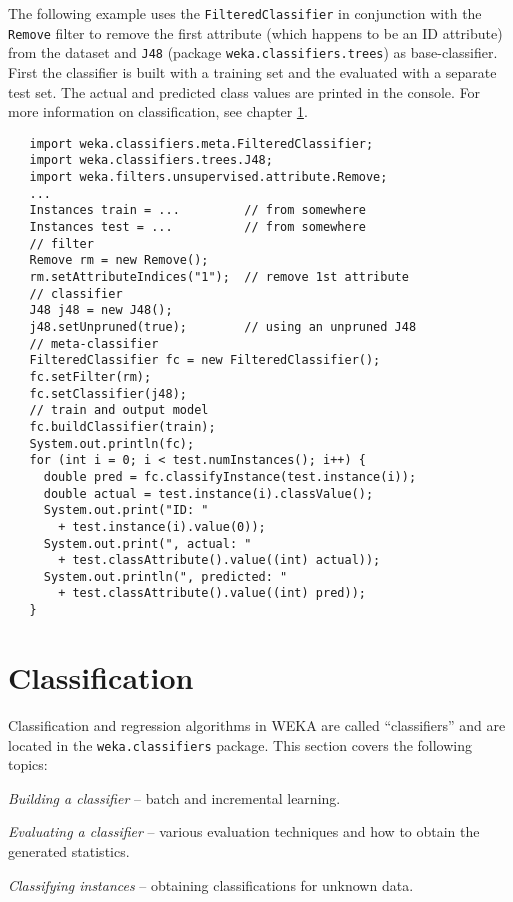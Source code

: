 The following example uses the \texttt{FilteredClassifier} in conjunction with
the \texttt{Remove} filter to remove the first attribute (which happens to be
an ID attribute) from the dataset and \texttt{J48} (package
\texttt{weka.classifiers.trees}) as base-classifier. First the classifier is
built with a training set and the evaluated with a separate test set. The actual
and predicted class values are printed in the console. For more information on
classification, see chapter \ref{api_classification}.
\begin{verbatim}
   import weka.classifiers.meta.FilteredClassifier;
   import weka.classifiers.trees.J48;
   import weka.filters.unsupervised.attribute.Remove;
   ...
   Instances train = ...         // from somewhere
   Instances test = ...          // from somewhere
   // filter
   Remove rm = new Remove();
   rm.setAttributeIndices("1");  // remove 1st attribute
   // classifier
   J48 j48 = new J48();
   j48.setUnpruned(true);        // using an unpruned J48
   // meta-classifier
   FilteredClassifier fc = new FilteredClassifier();
   fc.setFilter(rm);
   fc.setClassifier(j48);
   // train and output model
   fc.buildClassifier(train);
   System.out.println(fc);
   for (int i = 0; i < test.numInstances(); i++) {
     double pred = fc.classifyInstance(test.instance(i));
     double actual = test.instance(i).classValue();
     System.out.print("ID: "
       + test.instance(i).value(0));
     System.out.print(", actual: "
       + test.classAttribute().value((int) actual));
     System.out.println(", predicted: "
       + test.classAttribute().value((int) pred));
   }
\end{verbatim}

\newpage

\section{Classification}
\label{api_classification}
Classification and regression algorithms in WEKA are called ``classifiers'' and
are located in the \texttt{weka.classifiers} package. This section covers the
following topics:
\begin{tight_itemize}
	\item \textit{Building a classifier} -- batch and incremental learning.
	\item \textit{Evaluating a classifier} -- various evaluation techniques and
how to obtain the generated statistics.
	\item \textit{Classifying instances} -- obtaining classifications for
unknown data.
\end{tight_itemize}

